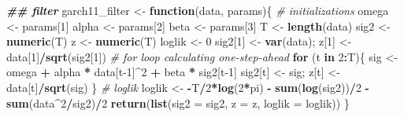 \documentclass[
]{book}
\newenvironment{Shaded}{\begin{snugshade}}{\end{snugshade}}
\newcommand{\AttributeTok}[1]{\textcolor[rgb]{0.13,0.29,0.53}{#1}}
\newcommand{\CommentTok}[1]{\textcolor[rgb]{0.56,0.35,0.01}{\textit{#1}}}
\newcommand{\ControlFlowTok}[1]{\textcolor[rgb]{0.13,0.29,0.53}{\textbf{#1}}}
\newcommand{\DecValTok}[1]{\textcolor[rgb]{0.00,0.00,0.81}{#1}}
\newcommand{\DocumentationTok}[1]{\textcolor[rgb]{0.56,0.35,0.01}{\textbf{\textit{#1}}}}
\newcommand{\FunctionTok}[1]{\textcolor[rgb]{0.13,0.29,0.53}{\textbf{#1}}}
\newcommand{\NormalTok}[1]{#1}
\newcommand{\OtherTok}[1]{\textcolor[rgb]{0.56,0.35,0.01}{#1}}
\newcommand{\SpecialCharTok}[1]{\textcolor[rgb]{0.81,0.36,0.00}{\textbf{#1}}}
\begin{document}
\begin{Shaded}
\begin{Highlighting}[]
\DocumentationTok{\#\# filter }
\NormalTok{garch11\_filter }\OtherTok{\textless{}{-}} \ControlFlowTok{function}\NormalTok{(data, params)\{}
  \CommentTok{\# initializations}
\NormalTok{  omega }\OtherTok{\textless{}{-}}\NormalTok{ params[}\DecValTok{1}\NormalTok{] }
\NormalTok{  alpha }\OtherTok{\textless{}{-}}\NormalTok{ params[}\DecValTok{2}\NormalTok{] }
\NormalTok{  beta }\OtherTok{\textless{}{-}}\NormalTok{ params[}\DecValTok{3}\NormalTok{]}
\NormalTok{  T }\OtherTok{\textless{}{-}} \FunctionTok{length}\NormalTok{(data)}
\NormalTok{  sig2 }\OtherTok{\textless{}{-}} \FunctionTok{numeric}\NormalTok{(T)}
\NormalTok{  z }\OtherTok{\textless{}{-}} \FunctionTok{numeric}\NormalTok{(T) }
\NormalTok{  loglik }\OtherTok{\textless{}{-}} \DecValTok{0}
\NormalTok{  sig2[}\DecValTok{1}\NormalTok{] }\OtherTok{\textless{}{-}} \FunctionTok{var}\NormalTok{(data); z[}\DecValTok{1}\NormalTok{] }\OtherTok{\textless{}{-}}\NormalTok{ data[}\DecValTok{1}\NormalTok{]}\SpecialCharTok{/}\FunctionTok{sqrt}\NormalTok{(sig2[}\DecValTok{1}\NormalTok{])}
  \CommentTok{\# for loop calculating one{-}step{-}ahead}
  \ControlFlowTok{for}\NormalTok{ (t }\ControlFlowTok{in} \DecValTok{2}\SpecialCharTok{:}\NormalTok{T)\{}
\NormalTok{    sig }\OtherTok{\textless{}{-}}\NormalTok{ omega }\SpecialCharTok{+}\NormalTok{ alpha }\SpecialCharTok{*}\NormalTok{ data[t}\DecValTok{{-}1}\NormalTok{]}\SpecialCharTok{\^{}}\DecValTok{2} \SpecialCharTok{+}\NormalTok{ beta }\SpecialCharTok{*}\NormalTok{ sig2[t}\DecValTok{{-}1}\NormalTok{]}
\NormalTok{    sig2[t] }\OtherTok{\textless{}{-}}\NormalTok{ sig; z[t] }\OtherTok{\textless{}{-}}\NormalTok{ data[t]}\SpecialCharTok{/}\FunctionTok{sqrt}\NormalTok{(sig)}
\NormalTok{  \}}
  \CommentTok{\# loglik}
\NormalTok{  loglik }\OtherTok{\textless{}{-}} \SpecialCharTok{{-}}\NormalTok{T}\SpecialCharTok{/}\DecValTok{2}\SpecialCharTok{*}\FunctionTok{log}\NormalTok{(}\DecValTok{2}\SpecialCharTok{*}\NormalTok{pi) }\SpecialCharTok{{-}} \FunctionTok{sum}\NormalTok{(}\FunctionTok{log}\NormalTok{(sig2))}\SpecialCharTok{/}\DecValTok{2} \SpecialCharTok{{-}} \FunctionTok{sum}\NormalTok{(data}\SpecialCharTok{\^{}}\DecValTok{2}\SpecialCharTok{/}\NormalTok{sig2)}\SpecialCharTok{/}\DecValTok{2}
  \FunctionTok{return}\NormalTok{(}\FunctionTok{list}\NormalTok{(}\AttributeTok{sig2 =}\NormalTok{ sig2, }\AttributeTok{z =}\NormalTok{ z, }\AttributeTok{loglik =}\NormalTok{ loglik))}
\NormalTok{\}}
\end{Highlighting}
\end{Shaded}
\end{document}
